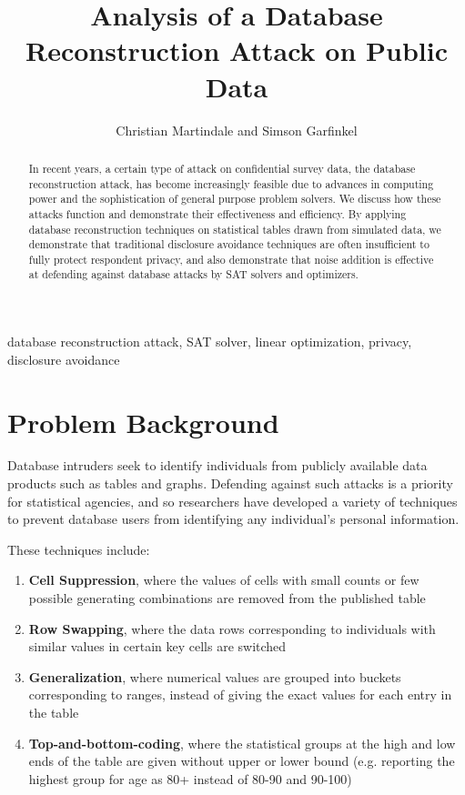 \documentclass[5p,times,11pt]{elsarticle}
\begin{document}
\begin{frontmatter}
\title{Analysis of a Database Reconstruction Attack on Public Data}

\author{Christian Martindale and Simson Garfinkel}
\address{Center for Disclosure Avoidance, U.S. Census Bureau}

\begin{abstract}
In recent years, a certain type of attack on confidential survey data,
the database reconstruction attack, has become increasingly feasible due to advances in computing power and the sophistication of general purpose problem solvers. We discuss how these attacks
function and demonstrate their effectiveness and efficiency. By applying database reconstruction techniques on statistical tables drawn from simulated data, we demonstrate that traditional disclosure avoidance techniques are often insufficient to fully protect respondent privacy, and also demonstrate that noise addition is effective at defending against database attacks by SAT solvers and optimizers.
\end{abstract}


\begin{keyword}
database reconstruction attack, SAT solver, linear optimization, privacy, disclosure avoidance
\end{keyword}
\end{frontmatter}


\section{Problem Background}
Database intruders seek to identify individuals from publicly
available data products such as tables and graphs.
Defending against such attacks is
a priority for statistical agencies, and so researchers
have developed a variety of techniques to prevent database users
from identifying any individual's personal information.

These techniques include:
\begin{enumerate}
  \item \textbf{Cell Suppression}, where the values of cells with small counts or few possible
        generating combinations are removed from the published table
  \item \textbf{Row Swapping}, where the data rows corresponding to individuals
        with similar values in certain key cells are switched
  \item \textbf{Generalization}, where numerical values are grouped into
        buckets corresponding to ranges, instead of giving the exact
        values for each entry in the table
  \item \textbf{Top-and-bottom-coding}, where the statistical groups at the high and low ends
        of the table are given without upper or lower bound (e.g.
        reporting the highest group for age as 80+ instead of
        80-90 and 90-100)
\end{enumerate}
\end{document}
